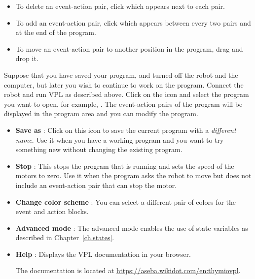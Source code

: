 
\begin{itemize}

\item To delete an event-action pair, click  which
appears next to each pair.

\item To add an event-action pair, click 
which appears between every two pairs and at the end of the program.

\item To move an event-action pair to another position in the
program, drag and drop it.

\end{itemize}


Suppose that you have saved your program, and turned off the robot and
the computer, but later you wish to continue to work on the program.
Connect the robot and run VPL as described above. Click on the icon
 and select the program you want to open, for example,
. The event-action pairs of the program will be displayed in
the program area and you can modify the program.


\begin{itemize}

\item \textbf{Save as} : Click on this icon to save the
current program with a \emph{different name}. Use it when you have a
working program and you want to try something new without changing the
existing program.

\item \textbf{Stop} : This stops the program that is running
and sets the speed of the motors to zero. Use it when the program asks
the robot to move but does not include an event-action pair that can
stop the motor.

\item \textbf{Change color scheme} : You can select a
different pair of colors for the event and action blocks.

\item \textbf{Advanced mode} : The advanced mode enables
the use of state variables as described in Chapter~\ref{ch.states}.

\item \textbf{Help} : Displays the VPL documentation in
your browser.

The documentation is located at
\url{https://aseba.wikidot.com/en:thymiovpl}.

\end{itemize}
